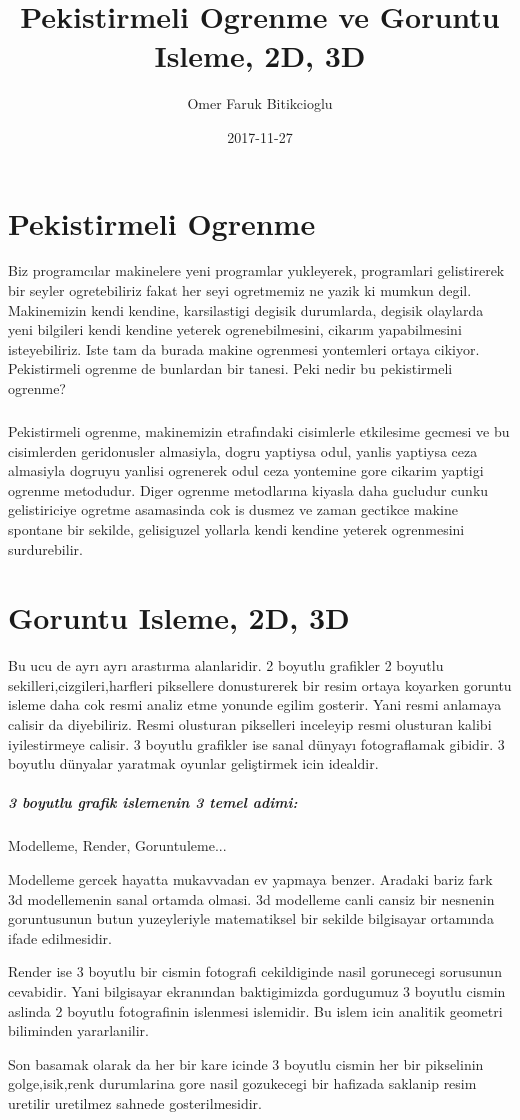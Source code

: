\documentclass{article}
\title{Pekistirmeli Ogrenme ve Goruntu Isleme, 2D, 3D}
\author{Omer Faruk Bitikcioglu}
\date{2017-11-27}
\begin{document}
	\maketitle
	\newpage
	\section{Pekistirmeli Ogrenme}
	
	Biz programcılar makinelere yeni programlar yukleyerek, programlari gelistirerek bir seyler ogretebiliriz fakat her seyi ogretmemiz ne yazik ki mumkun degil. Makinemizin kendi kendine, karsilastigi degisik durumlarda, degisik olaylarda yeni bilgileri kendi kendine yeterek ogrenebilmesini, cikarım yapabilmesini isteyebiliriz. Iste tam da burada makine ogrenmesi yontemleri ortaya cikiyor. Pekistirmeli ogrenme de bunlardan bir tanesi. Peki nedir bu pekistirmeli ogrenme?
	\subparagraph{}Pekistirmeli ogrenme, makinemizin etrafındaki cisimlerle etkilesime gecmesi ve bu cisimlerden geridonusler almasiyla, dogru yaptiysa odul, yanlis yaptiysa ceza almasiyla dogruyu yanlisi ogrenerek odul ceza yontemine gore cikarim yaptigi ogrenme metodudur. Diger ogrenme metodlarına kiyasla daha gucludur cunku gelistiriciye ogretme asamasinda cok is dusmez ve zaman gectikce makine spontane bir sekilde, gelisiguzel yollarla kendi kendine yeterek ogrenmesini surdurebilir. 
	\section{Goruntu Isleme, 2D, 3D}
	Bu ucu de ayrı ayrı arastırma alanlaridir. 2 boyutlu grafikler 2 boyutlu sekilleri,cizgileri,harfleri piksellere donusturerek bir resim ortaya koyarken goruntu isleme daha cok resmi analiz etme yonunde egilim gosterir. Yani resmi anlamaya calisir da diyebiliriz. Resmi olusturan pikselleri inceleyip resmi olusturan kalibi iyilestirmeye calisir. 3 boyutlu grafikler ise sanal dünyayı fotograflamak gibidir. 3 boyutlu dünyalar yaratmak oyunlar geliştirmek icin idealdir.
	\subparagraph{3 boyutlu grafik islemenin 3 temel adimi: } Modelleme, Render, Goruntuleme...
		
	Modelleme gercek hayatta mukavvadan ev yapmaya benzer. Aradaki bariz fark 3d modellemenin sanal ortamda olmasi. 3d modelleme canli cansiz bir nesnenin goruntusunun butun yuzeyleriyle matematiksel bir sekilde bilgisayar ortamında ifade edilmesidir.
	
	Render ise 3 boyutlu bir cismin fotografi cekildiginde nasil gorunecegi sorusunun cevabidir. Yani bilgisayar ekranından baktigimizda gordugumuz 3 boyutlu cismin aslinda 2 boyutlu fotografinin islenmesi islemidir. Bu islem icin analitik geometri biliminden yararlanilir.
	
	Son basamak olarak da her bir kare icinde 3 boyutlu cismin her bir pikselinin golge,isik,renk durumlarina gore nasil gozukecegi bir hafizada saklanip resim uretilir uretilmez sahnede gosterilmesidir. 
\end{document}
